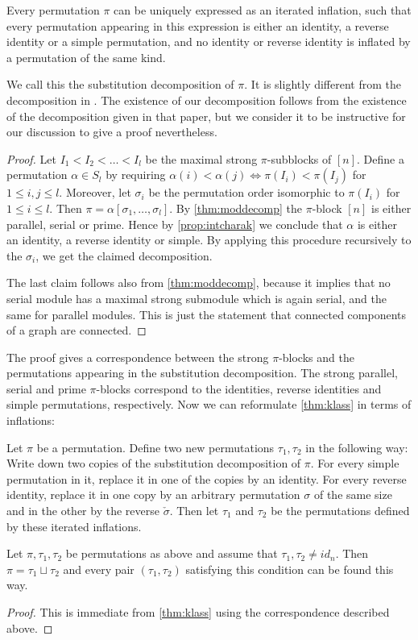 \documentclass{amsart}
\makeatletter
\theoremstyle{plain}
{
	\newtheorem{{lemma}}{{Lemma}}[section]
	\labelformat{{lemma}}{{Lemma}##}
}
{
	\newtheorem{{theorem}}{{Theorem}}[section]
	\labelformat{{theorem}}{{Theorem}##}
}
{	\@namedef{c@{theorem}}{\@nameuse{c@{lemma}}}}
{
	\newtheorem{{corollary}}{{Corollary}}[section]
	\labelformat{{corollary}}{{Corollary}##}
}
{	\@namedef{c@{corollary}}{\@nameuse{c@{lemma}}}}
{
	\newtheorem{{proposition}}{{Proposition}}[section]
	\labelformat{{proposition}}{{Proposition}##}
}
{	\@namedef{c@{proposition}}{\@nameuse{c@{lemma}}}}
{
	\newtheorem{{algorithm}}{{Construction}}[section]
	\labelformat{{algorithm}}{{Construction}##}
}
{	\@namedef{c@{algorithm}}{\@nameuse{c@{lemma}}}}
\theoremstyle{definition}
{
	\newtheorem{{definition}}{{Definition}}[section]
	\labelformat{{definition}}{{Definition}##}
}
{	\@namedef{c@{definition}}{\@nameuse{c@{lemma}}}}
{
	\newtheorem{{problem}}{{Problem}}[section]
	\labelformat{{problem}}{{Problem}##}
}
{	\@namedef{c@{problem}}{\@nameuse{c@{lemma}}}}
\makeatother
\begin{document}
\begin{proposition}
	Every permutation $\pi$ can be uniquely expressed as an iterated inflation, such that every permutation appearing in this expression is either an identity, a reverse identity or a simple permutation, and no identity or reverse identity is inflated by a permutation of the same kind.
\end{proposition}
We call this the substitution decomposition of $\pi$. It is slightly different from the decomposition in \cite{brignall2010survey}. The existence of our decomposition follows from the existence of the decomposition given in that paper, but we consider it to be instructive for our discussion to give a proof nevertheless.
\begin{proof}
	Let $I_1 < I_2 < \ldots < I_l$ be the maximal strong $\pi$-subblocks of $[n]$.
	Define a permutation $\alpha \in S_l$ by requiring $\alpha(i) < \alpha(j) \Leftrightarrow \pi(I_i) < \pi(I_j)$ for $1\leq i,j\leq l$. Moreover, let $\sigma_i$ be the permutation order isomorphic to $\pi(I_i)$ for $1\leq i\leq l$. Then $\pi = \alpha[\sigma_1,\ldots,\sigma_l]$.
	By \ref{thm:moddecomp} the $\pi$-block $[n]$ is either parallel, serial or prime.
	Hence by \ref{prop:intcharak} we conclude that $\alpha$ is either an identity, a reverse identity or simple. By applying this procedure recursively to the $\sigma_i$, we get the claimed decomposition.
	
	The last claim follows also from \ref{thm:moddecomp}, because it implies that no serial module has a maximal strong submodule which is again serial, and the same for parallel modules. This is just the statement that connected components of a graph are connected.
\end{proof}
The proof gives a correspondence between the strong $\pi$-blocks and the permutations appearing in the substitution decomposition. The strong parallel, serial and prime $\pi$-blocks correspond to the identities, reverse identities and simple permutations, respectively.
Now we can reformulate \ref{thm:klass} in terms of inflations:
\begin{algorithm}
	Let $\pi$ be a permutation. Define two new permutations $\tau_1,\tau_2$ in the following way:
	Write down two copies of the substitution decomposition of $\pi$.
	For every simple permutation in it, replace it in one of the copies by an identity.
	For every reverse identity, replace it in one copy by an arbitrary permutation $\sigma$ of the same size and in the other by the reverse ${\check{{\sigma}}}$.
	Then let $\tau_1$ and $\tau_2$ be the permutations defined by these iterated inflations.
\end{algorithm}
\begin{theorem} \label{thm:invdecomp}
	Let $\pi, \tau_1, \tau_2$ be permutations as above and assume that $\tau_1, \tau_2 \neq {id_{{n}}}$.
	Then $\pi = \tau_1 \operatorname{\sqcup} \tau_2$ and every pair $(\tau_1, \tau_2)$ satisfying this condition can be found this way.
\end{theorem}
\begin{proof}
	This is immediate from \ref{thm:klass} using the correspondence described above.
\end{proof}
\end{document}
